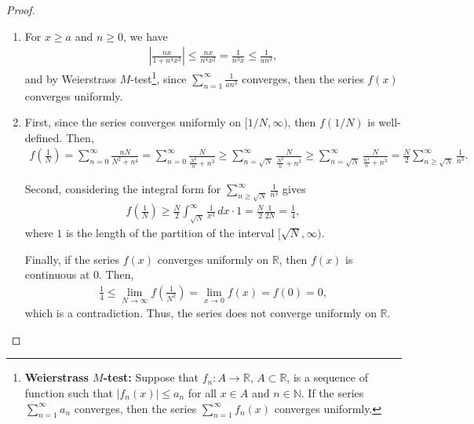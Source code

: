 \documentclass[11pt]{article}
\theoremstyle{definition}
\numberwithin{equation}{subsection}
\begin{document}
\begin{proof}
~\begin{enumerate}[label=(\alph*)]
    \item For $x \geq a$ and $n \geq 0$, we have
    \begin{align*}
        \left|\frac{nx}{1 + n^4x^2}\right| \leq \frac{nx}{n^4x^2} = \frac{1}{n^3x} \leq \frac{1}{an^3},
    \end{align*}
    and by Weierstrass $M$-test\footnote{{\bf Weierstrass $M$-test:} Suppose that $f_n: A \to \mathbb{R}$, $A \subset \mathbb{R}$, is a sequence of function such that $|f_n(x)| \leq a_n$ for all $x \in A$ and $n \in \mathbb{N}$. If the series $  \sum^\infty_{n=1}a_n$ converges, then the series $  \sum^\infty_{n=1}f_n(x)$ converges uniformly.}, since $  \sum^\infty_{n=1} \frac{1}{an^3}$ converges, then the series $f(x)$ converges uniformly.
    
    \item First, since the series converges uniformly on $[1/N, \infty)$, then $f(1/N)$ is well-defined. Then,
    \begin{align*}
        f\left(\frac{1}{N}\right) = \sum^\infty_{n=0} \frac{nN}{N^2 + n^4} = \sum^\infty_{n=0} \frac{N}{\frac{N^2}{n} + n^3} \geq \sum^\infty_{n=\sqrt{N}} \frac{N}{\frac{N^2}{n} + n^3} \geq \sum^\infty_{n=\sqrt{N}} \frac{N}{\frac{n^4}{n} + n^3} = \frac{N}{2} \sum^\infty_{n\geq \sqrt{N}} \frac{1}{n^3}.
    \end{align*}
    
    Second, considering the integral form for $  \sum^\infty_{n\geq \sqrt{N}} \frac{1}{n^3}$ gives
    \begin{align*}
        f\left(\frac{1}{N}\right) \geq \frac{N}{2} \int^\infty_{\sqrt{N}} \frac{1}{x^3}\, dx \cdot 1 = \frac{N}{2} \frac{1}{2N} = \frac{1}{4},
    \end{align*}
    where $1$ is the length of the partition of the interval $[\sqrt{N}, \infty)$. 
    
    Finally, if the series $f(x)$ converges uniformly on $\mathbb{R}$, then $f(x)$ is continuous at $0$. Then,
    \begin{align*}
        \frac{1}{4} \leq \lim_{N \to \infty} f\left(\frac{1}{N^2}\right) = \lim_{x\to 0} f(x) = f(0) = 0,
    \end{align*}
    which is a contradiction. Thus, the series does not converge uniformly on $\mathbb{R}$.
\end{enumerate}
\end{proof}
\end{document}
